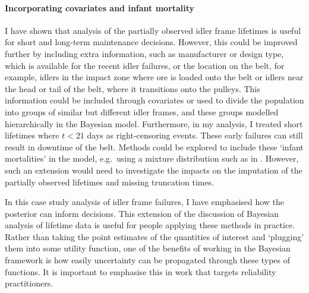 \paragraph*{Incorporating covariates and infant mortality}
I have shown that analysis of the partially observed idler frame lifetimes is useful for short and long-term maintenance decisions. However, this could be improved further by including extra information, such as manufacturer or design type, which is available for the recent idler failures, or the location on the belt, for example, idlers in the impact zone where ore is loaded onto the belt or idlers near the head or tail of the belt, where it transitions onto the pulleys. This information could be included through covariates or used to divide the population into groups of similar but different idler frames, and these groups modelled hierarchically in the Bayesian model. Furthermore, in my analysis, I treated short lifetimes where $t < 21$ days as right-censoring events. These early failures can still result in downtime of the belt. Methods could be explored to include these `infant mortalities' in the model, e.g.\ using a mixture distribution such as in \citet{mittman2013}. However, such an extension would need to investigate the impacts on the imputation of the partially observed lifetimes and missing truncation times.

In this case study analysis of idler frame failures, I have emphasised how the posterior can inform decisions. This extension of the discussion of Bayesian analysis of lifetime data is useful for people applying these methods in practice. Rather than taking the point estimates of the quantities of interest and `plugging' them into some utility function, one of the benefits of working in the Bayesian framework is how easily uncertainty can be propagated through these types of functions. It is important to emphasise this in work that targets reliability practitioners.